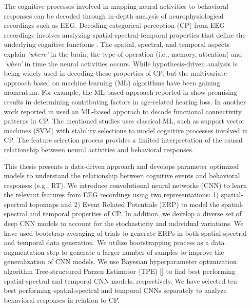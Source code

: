 \documentclass{article}
\begin{document}
The cognitive processes involved in mapping neural activities to behavioral responses can be decoded through in-depth analysis of neurophysiological recordings such as EEG. Decoding categorical perception (CP) from EEG recordings involves analyzing spatial-spectral-temporal properties that define the underlying cognitive functions \cite{beta2, Mahmud_2, Mahmud2019}. The spatial, spectral, and temporal aspects explain \emph{'where'} in the brain, the type of operation (i.e., memory, attention) and  \emph{'when'} in time the neural activities occurs. While hypothesis-driven analysis is being widely used in decoding these properties of CP, but the multivariate approach based on machine learning (ML) algorithms have been gaining momentum. For example, the ML-based approach reported in \cite{Mahmud2019, Mahmud_2} show promising results in determining contributing factors in age-related hearing loss. In another work reported in \cite{Al_Fahad_2020} used an ML-based apporach to decode functional connectivity patterns in CP. The mentioned studies uses classical ML, such as support vector machines (SVM) \cite{svm} with stability selections \cite{stability_selection} to model cognitive processes involved in CP. The feature selection process provides a limited interpretation of the causal relationship between neural activities and behavioral responses.


This thesis presents a data-driven approach and develops parameter optimized models to understand the relationship between cognitive events and behavioral responses (e.g., RT). We introduce convolutional neural networks (CNN) to learn the relevant features from EEG recordings using two representations: 1) spatial-spectral topomaps and 2) Event Related Potentials (ERP) to model the spatial-spectral and temporal properties of CP. In addition, we develop a diverse set of deep CNN models to account for the stochasticity and individual variations. We have used bootstrap averaging of trials to generate ERPs in both spatial-spectral and temporal data generation. We utilize bootstrapping process as a data augmentation step to generate a larger number of samples to improve the generalization of CNN models. We use Bayesian hyperparameter optimization algorithm Tree-structured Parzen Estimator (TPE) [\cite{TPE_1}] to find best performing spatial-spectral and temporal CNN models, respectively. We have selected ten best performing spatial-spectral and temporal CNNs separately to analyze behavioral responses in relation to CP.
\end{document}
